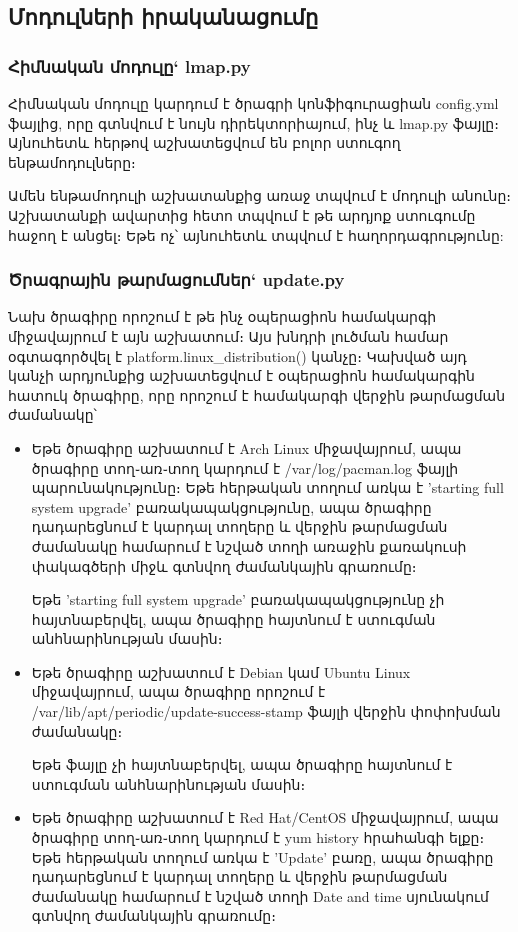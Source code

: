 \documentclass[12pt]{article}
\begin{document}
\begin{sloppypar}
\subsection{Մոդուլների իրականացումը}


\subsubsection{Հիմնական մոդուլը` lmap.py}


Հիմնական մոդուլը կարդում է ծրագրի կոնֆիգուրացիան config.yml ֆայլից,
որը գտնվում է նույն դիրեկտորիայում, ինչ և lmap.py ֆայլը։ Այնուհետև
հերթով աշխատեցվում են բոլոր ստուգող ենթամոդուլները։

Ամեն ենթամոդուլի աշխատանքից առաջ տպվում է մոդուլի անունը։
Աշխատանքի ավարտից հետո տպվում է թե արդյոք ստուգումը հաջող է անցել։
Եթե ոչ՝ այնուհետև տպվում է հաղորդագրությունը:


\subsubsection{Ծրագրային թարմացումներ` update.py}


Նախ ծրագիրը որոշում է թե ինչ օպերացիոն համակարգի միջավայրում է այն աշխատում։
Այս խնդրի լուծման համար օգտագործվել է platform.linux\_distribution() կանչը։
Կախված այդ կանչի արդյունքից աշխատեցվում է օպերացիոն համակարգին հատուկ
ծրագիրը, որը որոշում է համակարգի վերջին թարմացման ժամանակը՝

\begin{itemize}
\item Եթե ծրագիրը աշխատում է Arch Linux միջավայրում, ապա ծրագիրը տող֊առ֊տող
    կարդում է /var/log/pacman.log ֆայլի պարունակությունը։ Եթե հերթական տողում առկա է
	'starting full system upgrade' բառակապակցությունը, ապա ծրագիրը դադարեցնում
	է կարդալ տողերը և վերջին թարմացման ժամանակը համարում է նշված տողի առաջին
	քառակուսի փակագծերի միջև գտնվող ժամանկային գրառումը։

	Եթե 'starting full system upgrade' բառակապակցությունը չի հայտնաբերվել,
	ապա ծրագիրը հայտնում է ստուգման անհնարինության մասին։
\item Եթե ծրագիրը աշխատում է Debian կամ Ubuntu Linux միջավայրում, ապա ծրագիրը
	որոշում է /var/lib/apt/periodic/update-success-stamp ֆայլի վերջին փոփոխման
	ժամանակը։

	Եթե ֆայլը չի հայտնաբերվել, ապա ծրագիրը հայտնում է ստուգման անհնարինության
	մասին։
\item Եթե ծրագիրը աշխատում է Red Hat/CentOS միջավայրում, ապա ծրագիրը տող֊առ֊տող
    կարդում է yum history հրահանգի ելքը։ Եթե հերթական տողում առկա է
	'Update' բառը, ապա ծրագիրը դադարեցնում
	է կարդալ տողերը և վերջին թարմացման ժամանակը համարում է նշված տողի 
	Date and time սյունակում գտնվող ժամանկային գրառումը։


\end{itemize}
\end{sloppypar}
\end{document}

